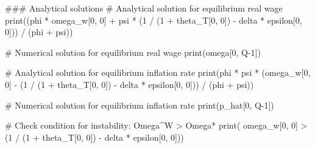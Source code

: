 \documentclass[
  letterpaper,
  DIV=11,
  numbers=noendperiod]{scrreprt}
\newenvironment{Shaded}{\begin{snugshade}}{\end{snugshade}}
\newcommand{\BuiltInTok}[1]{\textcolor[rgb]{0.00,0.23,0.31}{#1}}
\newcommand{\CommentTok}[1]{\textcolor[rgb]{0.37,0.37,0.37}{#1}}
\newcommand{\DecValTok}[1]{\textcolor[rgb]{0.68,0.00,0.00}{#1}}
\newcommand{\NormalTok}[1]{\textcolor[rgb]{0.00,0.23,0.31}{#1}}
\newcommand{\OperatorTok}[1]{\textcolor[rgb]{0.37,0.37,0.37}{#1}}
\begin{document}
\begin{tcolorbox}[enhanced jigsaw, titlerule=0mm, breakable, bottomrule=.15mm, toprule=.15mm, colbacktitle=quarto-callout-note-color!10!white, rightrule=.15mm, toptitle=1mm, opacityback=0, left=2mm, coltitle=black, title=\textcolor{quarto-callout-note-color}{\faInfo}\hspace{0.5em}{Python code}, colframe=quarto-callout-note-color-frame, opacitybacktitle=0.6, leftrule=.75mm, bottomtitle=1mm, arc=.35mm, colback=white]

\begin{Shaded}
\begin{Highlighting}[]

\CommentTok{\#\#\# Analytical solutions}
\CommentTok{\# Analytical solution for equilibrium real wage}
\BuiltInTok{print}\NormalTok{((phi }\OperatorTok{*}\NormalTok{ omega\_w[}\DecValTok{0}\NormalTok{, }\DecValTok{0}\NormalTok{] }\OperatorTok{+}\NormalTok{ psi }\OperatorTok{*}\NormalTok{ (}\DecValTok{1} \OperatorTok{/}\NormalTok{ (}\DecValTok{1} \OperatorTok{+}\NormalTok{ theta\_T[}\DecValTok{0}\NormalTok{, }\DecValTok{0}\NormalTok{]) }\OperatorTok{{-}}\NormalTok{ delta }\OperatorTok{*}\NormalTok{ epsilon[}\DecValTok{0}\NormalTok{, }\DecValTok{0}\NormalTok{])) }\OperatorTok{/}\NormalTok{ (phi }\OperatorTok{+}\NormalTok{ psi))}

\CommentTok{\# Numerical solution for equilibrium real wage}
\BuiltInTok{print}\NormalTok{(omega[}\DecValTok{0}\NormalTok{, Q}\OperatorTok{{-}}\DecValTok{1}\NormalTok{])}

\CommentTok{\# Analytical solution for equilibrium inflation rate}
\BuiltInTok{print}\NormalTok{(phi }\OperatorTok{*}\NormalTok{ psi }\OperatorTok{*}\NormalTok{ (omega\_w[}\DecValTok{0}\NormalTok{, }\DecValTok{0}\NormalTok{] }\OperatorTok{{-}}\NormalTok{ (}\DecValTok{1} \OperatorTok{/}\NormalTok{ (}\DecValTok{1} \OperatorTok{+}\NormalTok{ theta\_T[}\DecValTok{0}\NormalTok{, }\DecValTok{0}\NormalTok{]) }\OperatorTok{{-}}\NormalTok{ delta }\OperatorTok{*}\NormalTok{ epsilon[}\DecValTok{0}\NormalTok{, }\DecValTok{0}\NormalTok{])) }\OperatorTok{/}\NormalTok{ (phi }\OperatorTok{+}\NormalTok{ psi))}

\CommentTok{\# Numerical solution for equilibrium inflation rate}
\BuiltInTok{print}\NormalTok{(p\_hat[}\DecValTok{0}\NormalTok{, Q}\OperatorTok{{-}}\DecValTok{1}\NormalTok{]) }

\CommentTok{\# Check condition for instability: Omega\^{}W \textgreater{} Omega*}
\BuiltInTok{print}\NormalTok{( omega\_w[}\DecValTok{0}\NormalTok{, }\DecValTok{0}\NormalTok{] }\OperatorTok{\textgreater{}}\NormalTok{ (}\DecValTok{1} \OperatorTok{/}\NormalTok{ (}\DecValTok{1} \OperatorTok{+}\NormalTok{ theta\_T[}\DecValTok{0}\NormalTok{, }\DecValTok{0}\NormalTok{]) }\OperatorTok{{-}}\NormalTok{ delta }\OperatorTok{*}\NormalTok{ epsilon[}\DecValTok{0}\NormalTok{, }\DecValTok{0}\NormalTok{]))}


\end{Highlighting}
\end{Shaded}
\end{tcolorbox}
\end{document}
